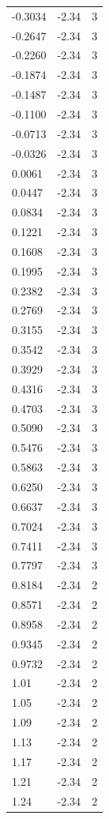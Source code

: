 \begin{longtable}{lrr}
  -0.3034 & -2.34 & 3 \\
  -0.2647 & -2.34 & 3 \\
  -0.2260 & -2.34 & 3 \\
  -0.1874 & -2.34 & 3 \\
  -0.1487 & -2.34 & 3 \\
  -0.1100 & -2.34 & 3 \\
  -0.0713 & -2.34 & 3 \\
  -0.0326 & -2.34 & 3 \\
  0.0061 & -2.34 & 3 \\
  0.0447 & -2.34 & 3 \\
  0.0834 & -2.34 & 3 \\
  0.1221 & -2.34 & 3 \\
  0.1608 & -2.34 & 3 \\
  0.1995 & -2.34 & 3 \\
  0.2382 & -2.34 & 3 \\
  0.2769 & -2.34 & 3 \\
  0.3155 & -2.34 & 3 \\
  0.3542 & -2.34 & 3 \\
  0.3929 & -2.34 & 3 \\
  0.4316 & -2.34 & 3 \\
  0.4703 & -2.34 & 3 \\
  0.5090 & -2.34 & 3 \\
  0.5476 & -2.34 & 3 \\
  0.5863 & -2.34 & 3 \\
  0.6250 & -2.34 & 3 \\
  0.6637 & -2.34 & 3 \\
  0.7024 & -2.34 & 3 \\
  0.7411 & -2.34 & 3 \\
  0.7797 & -2.34 & 3 \\
  0.8184 & -2.34 & 2 \\
  0.8571 & -2.34 & 2 \\
  0.8958 & -2.34 & 2 \\
  0.9345 & -2.34 & 2 \\
  0.9732 & -2.34 & 2 \\
  1.01 & -2.34 & 2 \\
  1.05 & -2.34 & 2 \\
  1.09 & -2.34 & 2 \\
  1.13 & -2.34 & 2 \\
  1.17 & -2.34 & 2 \\
  1.21 & -2.34 & 2 \\
  1.24 & -2.34 & 2 \\

\end{longtable}
